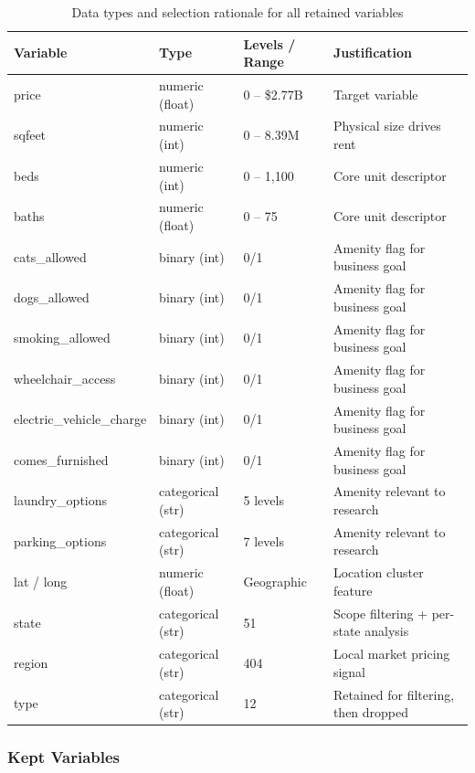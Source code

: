 \begin{table}[h!]
    \centering
    \small
    \begin{tabular}{||p{3.7cm}|p{2.5cm}|p{2.4cm}|p{5.5cm}||}
    \hline
    \hline
        Variable & Type & Levels / Range & Justification \\
    \hline
    \hline
        price & numeric (float) & 0 -- \$2.77B & Target variable \\
        sqfeet & numeric (int) & 0 -- 8.39M & Physical size drives rent \\
        beds & numeric (int) & 0 -- 1,100 & Core unit descriptor \\
        baths & numeric (float) & 0 -- 75 & Core unit descriptor \\
        cats\_allowed & binary (int) & 0/1 & Amenity flag for business goal \\
        dogs\_allowed & binary (int) & 0/1 & Amenity flag for business goal \\
        smoking\_allowed & binary (int) & 0/1 & Amenity flag for business goal \\
        wheelchair\_access & binary (int) & 0/1 & Amenity flag for business goal \\
        electric\_vehicle\_charge & binary (int) & 0/1 & Amenity flag for business goal \\
        comes\_furnished & binary (int) & 0/1 & Amenity flag for business goal \\
        laundry\_options & categorical (str) & 5 levels & Amenity relevant to research \\
        parking\_options & categorical (str) & 7 levels & Amenity relevant to research \\
        lat / long & numeric (float) & Geographic & Location cluster feature \\
        state & categorical (str) & 51 & Scope filtering + per-state analysis \\
        region & categorical (str) & 404 & Local market pricing signal \\
        type & categorical (str) & 12 & Retained for filtering, then dropped \\
    \hline
    \hline
    \end{tabular}
    \caption{Data types and selection rationale for all retained variables}
    \label{tab:data_selection}
\end{table}

\subsubsection{Kept Variables}

